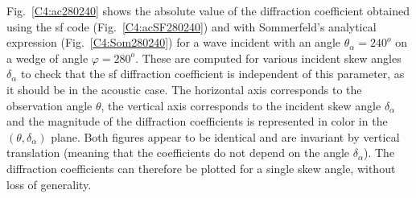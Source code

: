 Fig.~\ref{C4:ac280240} shows the absolute value of the diffraction coefficient obtained using the \acrshort{sf} code (Fig.~\ref{C4:acSF280240}) and with Sommerfeld's analytical expression (Fig.~\ref{C4:Som280240}) for a wave incident with an angle $\theta_{\alpha}=240^o$ on a wedge of angle $\varphi=280^o$. These are computed for various incident skew angles $\delta_{\alpha}$ to check that the \acrshort{sf} diffraction coefficient is independent of this parameter, as it should be in the acoustic case. The horizontal axis corresponds to the observation angle $\theta$, the vertical axis corresponds to the incident skew angle $\delta_{\alpha}$ and the magnitude of the diffraction coefficients is represented in color in the $(\theta,\delta_{\alpha})$ plane. Both figures appear to be identical and are invariant by vertical translation (meaning that the coefficients do not depend on the angle $\delta_{\alpha}$). The diffraction coefficients can therefore be plotted for a single skew angle, without loss of generality. 

